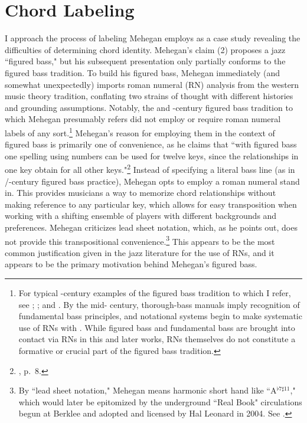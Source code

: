 \section{Chord Labeling}
I approach the process of labeling Mehegan employs as a case study revealing the difficulties of determining chord identity.  Mehegan's claim (2) proposes a jazz ``figured bass," but his subsequent presentation only partially conforms to the figured bass tradition.  To build his figured bass, Mehegan immediately (and somewhat unexpectedly) imports roman numeral (RN) analysis from the western music theory tradition, conflating two strains of thought with different histories and grounding assumptions.  Notably, the  and -century figured bass tradition to which Mehegan presumably refers did not employ or require roman numeral labels of any sort.\footnote{For typical -century examples of the figured bass tradition to which I refer, see \cite{heinichen1711}; \cite{heinichen1728}; and \cite{mattheson1739}.  By the mid- century, thorough-bass manuals imply recognition of fundamental bass principles, and notational systems begin to make systematic use of RNs with \cite{vogler1776}.  While figured bass and fundamental bass are brought into contact via RNs in this and later works, RNs themselves do not constitute a formative or crucial part of the figured bass tradition.}  Mehegan's reason for employing them in the context of figured bass is primarily one of convenience, as he claims that ``with figured bass one spelling using numbers can be used for twelve keys, since the relationships in one key obtain  for all other keys."\footnote{\cite{mehegan1959}, p.\ 8.}  Instead of specifying a literal bass line (as in /-century figured bass practice), Mehegan opts to employ a roman numeral stand in.  This provides musicians a way to memorize chord relationships without making reference to any particular key, which allows for easy transposition when working with a shifting ensemble of players with different backgrounds and preferences.  Mehegan criticizes lead sheet notation, which, as he points out, does not provide this transpositional convenience.\footnote{By ``lead sheet notation," Mehegan means harmonic short hand like ``A$^{\flat 7 \sharp 11}$," which would later be epitomized by the underground ``Real Book" circulations begun at Berklee and adopted and licensed by Hal Leonard in 2004.  See \cite{realbook}.}  This appears to be the most common justification given in the jazz literature for the use of RNs, and it appears to be the primary motivation behind Mehegan's figured bass.

